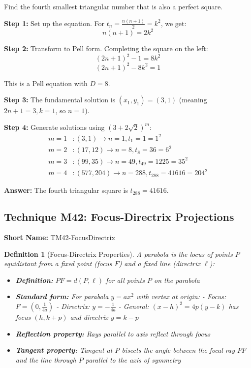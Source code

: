 \documentclass[12pt]{article}
\newtheorem{definition}{Definition}[section]
\newenvironment{problem}[1]
{\begin{tcolorbox}[colback=blue!5!white,colframe=blue!75!black,title={#1}]}{\end{tcolorbox}}
\newenvironment{solution}
{\begin{tcolorbox}[colback=green!5!white,colframe=green!75!black,title={Solution}]}{\end{tcolorbox}}
\begin{document}
\begin{problem}{Example: Triangular Numbers that are Perfect Squares}
Find the fourth smallest triangular number that is also a perfect square.
\end{problem}

\begin{solution}
\textbf{Step 1:} Set up the equation. For $t_n = \frac{n(n+1)}{2} = k^2$, we get:
\[n(n+1) = 2k^2\]

\textbf{Step 2:} Transform to Pell form. Completing the square on the left:
\[(2n+1)^2 - 1 = 8k^2\]
\[(2n+1)^2 - 8k^2 = 1\]

This is a Pell equation with $D=8$.

\textbf{Step 3:} The fundamental solution is $(x_1, y_1) = (3, 1)$ (meaning $2n+1=3, k=1$, so $n=1$).

\textbf{Step 4:} Generate solutions using $(3+2\sqrt{2})^m$:
\begin{align}
m=1&: (3,1) \rightarrow n=1, t_1 = 1 = 1^2\\
m=2&: (17,12) \rightarrow n=8, t_8 = 36 = 6^2\\
m=3&: (99,35) \rightarrow n=49, t_{49} = 1225 = 35^2\\
m=4&: (577,204) \rightarrow n=288, t_{288} = 41616 = 204^2
\end{align}

\textbf{Answer:} The fourth triangular square is $t_{288} = 41616$.
\end{solution}

\subsection{Technique M42: Focus-Directrix Projections}
\textbf{Short Name:} TM42-FocusDirectrix

\begin{definition}[Focus-Directrix Properties]
A parabola is the locus of points $P$ equidistant from a fixed point (focus $F$) and a fixed line (directrix $\ell$):
\begin{itemize}
    \item \textbf{Definition:} $PF = d(P,\ell)$ for all points $P$ on the parabola
    \item \textbf{Standard form:} For parabola $y = ax^2$ with vertex at origin:
        - Focus: $F = (0, \frac{1}{4a})$
        - Directrix: $y = -\frac{1}{4a}$
        - General: $(x-h)^2 = 4p(y-k)$ has focus $(h, k+p)$ and directrix $y = k-p$
    \item \textbf{Reflection property:} Rays parallel to axis reflect through focus
    \item \textbf{Tangent property:} Tangent at $P$ bisects the angle between the focal ray $PF$ and the line through $P$ parallel to the axis of symmetry
\end{itemize}
\end{definition}
\end{document}
